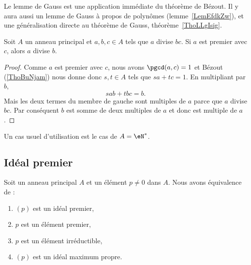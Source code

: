 Le lemme de Gauss est une application immédiate du théorème de Bézout. Il y aura aussi un lemme de Gauss à propos de polynômes (lemme~\ref{LemEfdkZw}), et une généralisation directe au théorème de Gauss, théorème~\ref{ThoLLgIsig}.
\begin{lemma}    \label{LemSdnZNX}
	Soit \( A\) un anneau principal et \( a,b,c\in A\) tels que \( a\) divise \( bc\). Si \( a\) est premier avec \( c\), alors \( a\) divise \( b\).
\end{lemma}

\begin{proof}
	Comme \( a\) est premier avec \( c\), nous avons \( \pgcd(a,c)=1\) et Bézout (\ref{ThoBuNjam}) nous donne donc \( s,t\in A\) tels que \( sa+tc=1\). En multipliant par \( b\),
	\begin{equation}
		sab+tbc=b.
	\end{equation}
	Mais les deux termes du membre de gauche sont multiples de \( a\) parce que \( a\) divise \( bc\). Par conséquent \( b\) est somme de deux multiples de \( a\) et donc est multiple de \( a\).
\end{proof}
Un cas usuel d'utilisation est le cas de \( A=\eN^*\).

\subsection{Idéal premier}

\begin{proposition}     \label{PROPooZICGooNmblhl}
	Soit un anneau principal \( A\) et un élément \( p\neq 0\) dans \( A\). Nous avons équivalence de :
	\begin{enumerate}
		\item   \label{ITEMooBTEAooWlFUTX}
		      \( (p)\) est un idéal premier,
		\item   \label{ITEMooKQRMooBNPDMX}
		      \( p\) est un élément premier,
		\item   \label{ITEMooZYYJooCWiBhL}
		      \( p\) est un élément irréductible,
		\item   \label{ITEMooHPAIooYoQzqD}
		      \( (p)\) est un idéal maximum propre.
	\end{enumerate}
\end{proposition}

